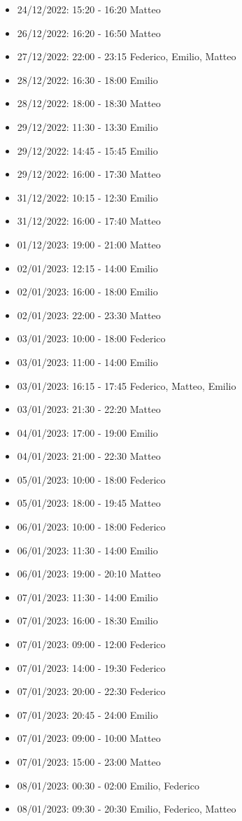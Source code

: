 \begin{itemize}
    \item 24/12/2022: 15:20 - 16:20 Matteo
    \item 26/12/2022: 16:20 - 16:50 Matteo
    \item 27/12/2022: 22:00 - 23:15 Federico, Emilio, Matteo
    \item 28/12/2022: 16:30 - 18:00 Emilio
    \item 28/12/2022: 18:00 - 18:30 Matteo
    \item 29/12/2022: 11:30 - 13:30 Emilio
    \item 29/12/2022: 14:45 - 15:45 Emilio
    \item 29/12/2022: 16:00 - 17:30 Matteo
    \item 31/12/2022: 10:15 - 12:30 Emilio
    \item 31/12/2022: 16:00 - 17:40 Matteo
    \item 01/12/2023: 19:00 - 21:00 Matteo
    \item 02/01/2023: 12:15 - 14:00 Emilio
    \item 02/01/2023: 16:00 - 18:00 Emilio
    \item 02/01/2023: 22:00 - 23:30 Matteo
    \item 03/01/2023: 10:00 - 18:00 Federico
    \item 03/01/2023: 11:00 - 14:00 Emilio
    \item 03/01/2023: 16:15 - 17:45 Federico, Matteo, Emilio
    \item 03/01/2023: 21:30 - 22:20 Matteo
    \item 04/01/2023: 17:00 - 19:00 Emilio
    \item 04/01/2023: 21:00 - 22:30 Matteo
    \item 05/01/2023: 10:00 - 18:00 Federico
    \item 05/01/2023: 18:00 - 19:45 Matteo
    \item 06/01/2023: 10:00 - 18:00 Federico
    \item 06/01/2023: 11:30 - 14:00 Emilio
    \item 06/01/2023: 19:00 - 20:10 Matteo
    \item 07/01/2023: 11:30 - 14:00 Emilio
    \item 07/01/2023: 16:00 - 18:30 Emilio
    \item 07/01/2023: 09:00 - 12:00 Federico
    \item 07/01/2023: 14:00 - 19:30 Federico
    \item 07/01/2023: 20:00 - 22:30 Federico
    \item 07/01/2023: 20:45 - 24:00 Emilio
    \item 07/01/2023: 09:00 - 10:00 Matteo
    \item 07/01/2023: 15:00 - 23:00 Matteo
    \item 08/01/2023: 00:30 - 02:00 Emilio, Federico
    \item 08/01/2023: 09:30 - 20:30 Emilio, Federico, Matteo
\end{itemize}
\clearpage